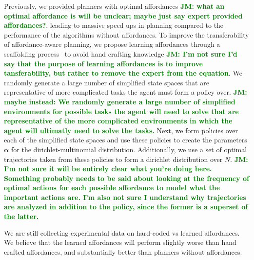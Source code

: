 \documentclass[]{article}
\newcommand{\jmnote}[1]{\textcolor{Green}{\textbf{JM: #1}}}
\begin{document}
Previously, we provided planners with optimal affordances \jmnote{what an optimal affordance is will be unclear; maybe just say expert provided affordances?}, leading to massive
speed ups in planning compared to the performance of the algorithms without affordances.  To improve 
the transferability of affordance-aware planning, we propose learning affordances through 
a scaffolding process~\citep{bruner76} to avoid hand crafting knowledge \jmnote{I'm not sure I'd say that the purpose of learning affordances is to improve tansferability, but rather to remove the expert from the equation}. We randomly generate a large number of 
simplified state spaces that are representative of more complicated tasks the agent must form a policy over. \jmnote{maybe instead: We randomly generate a large number of 
simplified environments for possible tasks the agent will need to solve that are representative of the more complicated environments in which the agent will ultimatly need to solve the tasks.}
Next, we form policies over each of the simplified state spaces and use these policies to create the 
parameters $\boldsymbol{\alpha}$ for the  dirichlet-multinomial distribution.
Additionally, we use a set of optimal trajectories taken from these policies to form a dirichlet distribution over $N$. \jmnote{I'm not sure it will be entirely clear what you're doing here. Something probably needs to be said about looking at the frequency of optimal actions for each possible affordance to model what the important actions are. I'm also not sure I understand why trajectories are analyzed {\em} in addition to the policy, since the former is a superset of the latter.}

We are still collecting experimental data on hard-coded vs learned affordances. We believe that the learned
affordances will perform slightly worse than hand crafted affordances, and substantially better than planners
without affordances. 

{\small

  
}
\end{document}
